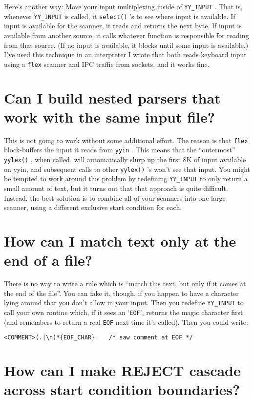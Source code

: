\documentclass[openany,oneside]{book}
\begin{document}
Here's another way:  Move your input multiplexing inside of \verb`YY_INPUT` .  That
is, whenever \verb`YY_INPUT` is called, it \verb`select()` 's to see where input is
available.  If input is available for the scanner, it reads and returns the
next byte.  If input is available from another source, it calls whatever
function is responsible for reading from that source.  (If no input is
available, it blocks until some input is available.)  I've used this technique in an
interpreter I wrote that both reads keyboard input using a \verb`flex` scanner and
IPC traffic from sockets, and it works fine.
\section{Can I build nested parsers that work with the same input file?}


This is not going to work without some additional effort.  The reason is
that \verb`flex` block-buffers the input it reads from \verb`yyin` .  This means that the
“outermost” \verb`yylex()` , when called, will automatically slurp up the first 8K
of input available on yyin, and subsequent calls to other \verb`yylex()` 's won't
see that input.  You might be tempted to work around this problem by
redefining \verb`YY_INPUT` to only return a small amount of text, but it turns out
that that approach is quite difficult.  Instead, the best solution is to
combine all of your scanners into one large scanner, using a different
exclusive start condition for each.
\section{How can I match text only at the end of a file?}


There is no way to write a rule which is “match this text, but only if
it comes at the end of the file”.  You can fake it, though, if you happen
to have a character lying around that you don't allow in your input. 
Then you redefine \verb`YY_INPUT` to call your own routine which, if it sees
an ‘\verb`EOF`’, returns the magic character first (and remembers to return a
real \verb`EOF` next time it's called).  Then you could write:
\begin{verbatim}
<COMMENT>(.|\n)*{EOF_CHAR}    /* saw comment at EOF */
\end{verbatim}

\section{How can I make REJECT cascade across start condition boundaries?}
\end{document}
